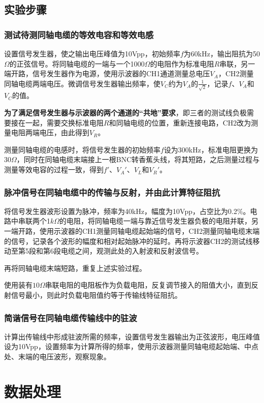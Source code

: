 \documentclass[UTF8]{ctexart}
\begin{document}
\subsection{实验步骤}
\subsubsection{测试待测同轴电缆的等效电容和等效电感}
设置信号发生器，使之输出电压峰值为10Vpp，初始频率$f$为60kHz，输出阻抗为50$\Omega$的正弦信号。将同轴电缆的一端与一个1000$\Omega$的电阻作为标准电阻$R$串联，另一端开路，信号发生器作为电源，使用示波器的CH1通道测量总电压$V_A$，CH2测量同轴电缆两端电压。微调信号发生器输出频率，使$V_C$约为$V_A$的$\frac{1}{\sqrt{2}}$，记录$f$、$V_A$和$V_C$的值。

\textbf{为了满足信号发生器与示波器的两个通道的“共地”要求}，即三者的测试线负极需要接在一起，需要交换标准电阻$R$和同轴电缆的位置，重新连接电路，CH2改为测量电阻两端电压，由此得到$V_R$。

测量同轴电缆的电感时，将信号发生器的初始频率$f$设为300kHz，标准电阻更换为30$\Omega$，同时在同轴电缆末端接上一根BNC转香蕉头线，将其短路，之后测量过程与测量等效电容的过程一致，得到$f'$、$V_A'$、$V_L$和$V_R'$。

\subsubsection{脉冲信号在同轴电缆中的传输与反射，并由此计算特征阻抗}
将信号发生器波形设置为脉冲，频率为40kHz，幅度为10Vpp，占空比为0.2$\%$。电路中串联两个1$k\Omega$的电阻，将同轴电缆一端与靠近信号发生器负极的电阻并联，另一端开路，使用示波器的CH1测量同轴电缆起始端的信号，CH2测量同轴电缆末端的信号，记录各个波形的幅度和相对起始脉冲的延时。再将示波器CH2的测试线移动至第5段和第6段电缆之间，观测此处的入射波和反射波信号。

再将同轴电缆末端短路，重复上述实验过程。

使用装有$10\Omega$串联电阻的电阻板作为负载电阻，反复调节接入的阻值大小，直到反射信号最小，则此时负载电阻值约等于传输线特征阻抗。
\subsubsection{简谐信号在同轴电缆传输线中的驻波}
计算出传输线中形成驻波所需的频率，设置信号发生器输出为正弦波形，电压峰值设为10Vpp，设置频率为计算所得的频率，使用示波器测量同轴电缆起始端、中点处、末端的电压波形，观察现象。

\section{数据处理}
\end{document}
